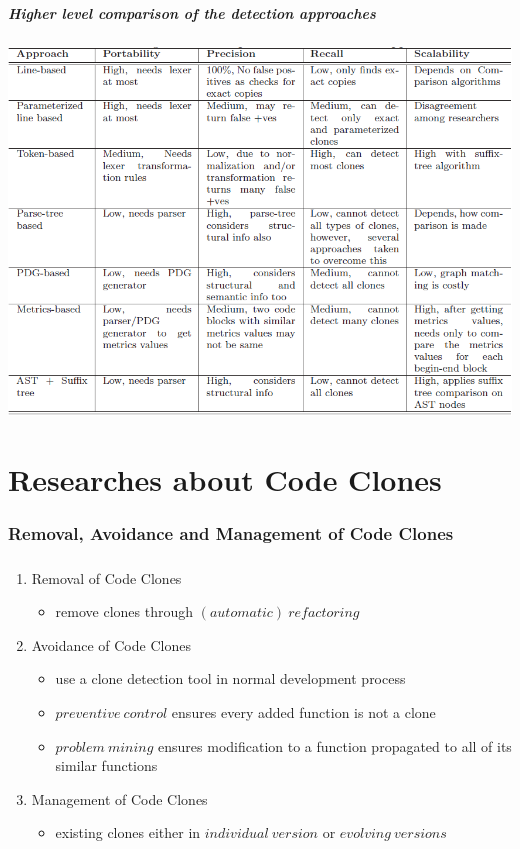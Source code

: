 \documentclass[pdf]{beamer}
\begin{document}
\begin{frame}
\frametitle{Higher level comparison of the detection approaches}
\begin{center}
\includegraphics[width=.9\textwidth]{cmp.png}
\end{center}
\end{frame}

\part{Researches about Code Clones}
\frame{\partpage}

\section{Removal, Avoidance and Management of Code Clones}
\begin{frame}
\frametitle{\secname}
\begin{block}{}
\begin{enumerate}
  \item Removal of Code Clones
  \begin{itemize}
    \item remove clones through ${(automatic)\ refactoring}$
  \end{itemize}
  \item Avoidance of Code Clones
  \begin{itemize}
    \item use a clone detection tool in normal development process
    \item $preventive\ control$ ensures every added function is not a clone
    \item $problem\ mining$ ensures modification to a function propagated
    to all of its similar functions
  \end{itemize}
  \item Management of Code Clones
  \begin{itemize}
    \item {} existing clones either
    in $individual\ version$ or $evolving\ versions$
  \end{itemize}
  \end{enumerate}
\end{block}
\end{frame}
\end{document}
